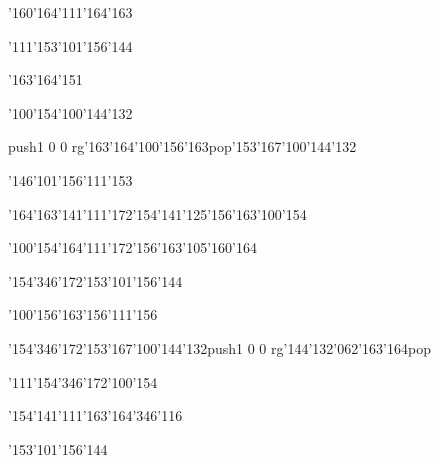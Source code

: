 \null\vfill\ipa\centerline{\enskip\enskip\enskip\enskip\enskip\enskip\enskip\enskip\char'160\char'164\char'111\char'164\char'163}\medskip\centerline{\enskip\char'111\enskip\enskip\enskip\enskip\enskip\char'153\char'101\char'156\char'144\enskip\enskip\enskip}\medskip\centerline{\enskip\enskip\enskip\char'163\char'164\char'151\enskip\enskip\enskip\enskip\enskip\enskip}\medskip\centerline{\enskip\char'100\char'154\enskip\char'100\char'144\char'132\enskip\enskip\enskip\enskip\enskip\enskip\enskip}\medskip\centerline{\enskip\enskip\enskip\enskip\enskip\pdfcolorstack\match push{1 0 0 rg}\char'163\char'164\char'100\char'156\char'163\pdfcolorstack\match pop{}\enskip\char'153\char'167\char'100\char'144\char'132\enskip\enskip\enskip}\medskip\centerline{\enskip\enskip\enskip\enskip\enskip\enskip\enskip\char'146\char'101\char'156\enskip\enskip\enskip\enskip\enskip\char'111\char'153}\medskip\centerline{\enskip\char'164\char'163\char'141\char'111\char'172\enskip\enskip\enskip\enskip\char'154\char'141\char'125\char'156\char'163\enskip\char'100\char'154}\medskip\centerline{\enskip\enskip\enskip\enskip\enskip\enskip\enskip\enskip\enskip\enskip\enskip\enskip}\medskip\centerline{\enskip\enskip\enskip\enskip\enskip\enskip\enskip\enskip\enskip\enskip\enskip\enskip\enskip\enskip\enskip}\medskip\vfill\footline{\hfil\tt\folio\hfil}\eject
\null\vfill\ipa\centerline{\enskip\char'100\char'154\enskip\char'164\char'111\char'172\enskip\char'156\char'163\char'105\char'160\char'164}\medskip\centerline{\enskip\enskip\enskip\char'154\char'346\char'172\enskip\char'153\char'101\char'156\char'144\enskip\enskip\enskip}\medskip\centerline{\enskip\enskip\enskip\enskip\enskip\enskip\enskip\enskip\enskip\enskip\enskip\enskip}\medskip\centerline{\enskip\enskip\enskip\enskip\char'100\char'156\char'163\enskip\enskip\enskip\enskip\char'156\char'111\char'156}\medskip\centerline{\enskip\char'154\char'346\char'172\enskip\char'153\char'167\char'100\char'144\char'132\enskip\pdfcolorstack\match push{1 0 0 rg}\char'144\char'132\char'062\char'163\char'164\pdfcolorstack\match pop{}\enskip\enskip\enskip}\medskip\centerline{\enskip\char'111\enskip\enskip\enskip\enskip\enskip\enskip\enskip\enskip\enskip\char'154\char'346\char'172\enskip\char'100\char'154}\medskip\centerline{\enskip\enskip\enskip\enskip\enskip\enskip\enskip\enskip\enskip\enskip\char'154\char'141\char'111\char'163\char'164\enskip\char'346\char'116}\medskip\centerline{\enskip\enskip\enskip\enskip\enskip\enskip\enskip\enskip\enskip\enskip\enskip\enskip}\medskip\centerline{\enskip\enskip\enskip\enskip\enskip\enskip\enskip\enskip\enskip\enskip\enskip\char'153\char'101\char'156\char'144}\medskip\vfill\footline{\hfil\tt\folio\hfil}\eject
